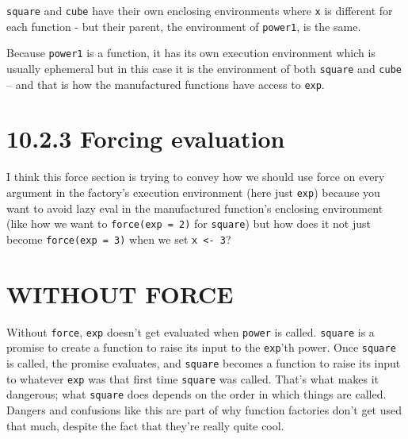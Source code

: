 \documentclass[]{book}
\begin{document}
\texttt{square} and \texttt{cube} have their own enclosing environments where \texttt{x} is different for each function - but their parent, the environment of \texttt{power1}, is the same.

Because \texttt{power1} is a function, it has its own execution environment which is usually ephemeral but in this case it is the environment of both \texttt{square} and \texttt{cube} -- and that is how the manufactured functions have access to \texttt{exp}.

\hypertarget{forcing-evaluation}{%
\section*{10.2.3 Forcing evaluation}\label{forcing-evaluation}}

I think this force section is trying to convey how we should use force on every argument in the factory's execution environment (here just \texttt{exp}) because you want to avoid lazy eval in the manufactured function's enclosing environment (like how we want to \texttt{force(exp\ =\ 2)} for \texttt{square}) but how does it not just become \texttt{force(exp\ =\ 3)} when we set \texttt{x\ \textless{}-\ 3}?

\hypertarget{without-force}{%
\section{WITHOUT FORCE}\label{without-force}}

Without \texttt{force}, \texttt{exp} doesn't get evaluated when \texttt{power} is called. \texttt{square} is a promise to create a function to raise its input to the \texttt{exp}'th power. Once \texttt{square} is called, the promise evaluates, and \texttt{square} becomes a function to raise its input to whatever \texttt{exp} was that first time \texttt{square} was called. That's what makes it dangerous; what \texttt{square} does depends on the order in which things are called. Dangers and confusions like this are part of why function factories don't get used that much, despite the fact that they're really quite cool.
\end{document}
